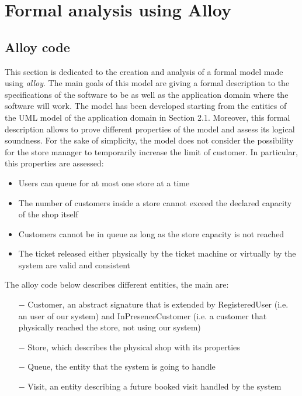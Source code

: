 \documentclass[]{article}
\begin{document}
		
	\section{Formal analysis using Alloy}
	\subsection{Alloy code}
	
	This section is dedicated to the creation and analysis of a formal model made using \textit{alloy}. \newline
	The main goals of this model are giving a formal description to the specifications of the software to be as well as the application domain where the software will work. \newline
	The model has been developed starting from the entities of the UML model of the application domain in Section 2.1. \newline
	Moreover, this formal description allows to prove different properties of the model and assess its logical soundness. \newline
	For the sake of simplicity, the model does not consider the possibility for the store manager to temporarily increase the limit of customer. \newline
	In particular, this properties are assessed:
	
	\begin{itemize}
	
		\item Users can queue for at most one store at a time
		\item The number of customers inside a store cannot exceed the declared capacity of the shop itself
		\item Customers cannot be in queue as long as the store capacity is not reached
		\item The ticket released either physically by the ticket machine or virtually by the system are valid and consistent
	
	\end{itemize}
	
	The alloy code below describes different entities, the main are:
	
	\begin{itemize}

    \item[$-$] Customer, an abstract signature that is extended by RegisteredUser (i.e. an user of our system) and InPresenceCustomer (i.e. a customer that physically reached the store, not using our system)
    \item[$-$] Store, which describes the physical shop with its properties
    \item[$-$] Queue, the entity that the system is going to handle
    \item[$-$] Visit, an entity describing a future booked visit handled by the system
    \newline
	\newline
    
	\end{itemize}
	
\end{document}
